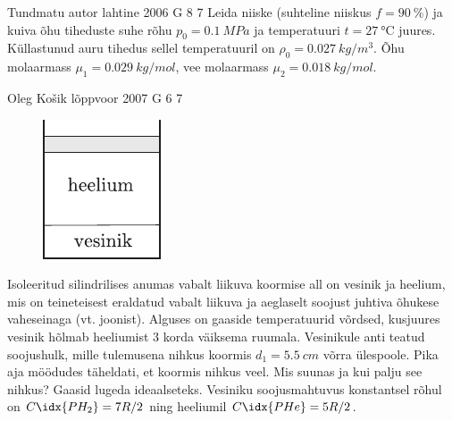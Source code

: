 \documentclass[11pt]{article}
\begin{document}
{%
{Tundmatu autor} %
{lahtine} %
{2006} %
{G 8} %
{7} %
{
\ifStatement
Leida niiske (suhteline niiskus $f = \SI{90}{\%}$) ja kuiva õhu tiheduste suhe rõhu $p_0 = \SI{0,1}{MPa}$ ja temperatuuri $t = \SI{27}{\celsius}$ juures. Küllastunud auru tihedus sellel temperatuuril on $\rho_0 = \SI{0,027}{kg/m^3}$. Õhu molaarmass $\mu_1 = \SI{0,029}{kg/mol}$, vee molaarmass $\mu_2 = \SI{0,018}{kg/mol}$.
\fi
}

{Oleg Košik} %
{lõppvoor} %
{2007} %
{G 6} %
{7} %
{
\ifStatement
\begin{figure}
	\begin{center}
		\vspace{-20pt}
		\includegraphics[width=0.95\linewidth]{2007-v3g-06-yl}
	\end{center}
\end{figure}
Isoleeritud silindrilises anumas vabalt liikuva koormise all on vesinik ja heelium, mis on teineteisest eraldatud vabalt liikuva ja aeglaselt soojust juhtiva õhukese vaheseinaga (vt. joonist). Alguses on gaaside temperatuurid võrdsed, kusjuures vesinik hõlmab heeliumist 3 korda väiksema ruumala. Vesinikule anti teatud soojushulk, mille tulemusena nihkus koormis $d_1 = \SI{5,5}{cm}$ võrra ülespoole. Pika aja möödudes täheldati, et koormis nihkus veel. Mis suunas ja kui palju see nihkus? Gaasid lugeda ideaalseteks. Vesiniku soojusmahtuvus konstantsel rõhul on $C\idx{PH_2} = 7R/2$ ning heeliumil $C\idx{PHe} = 5R/2$.
\fi
}

}
\end{document}
